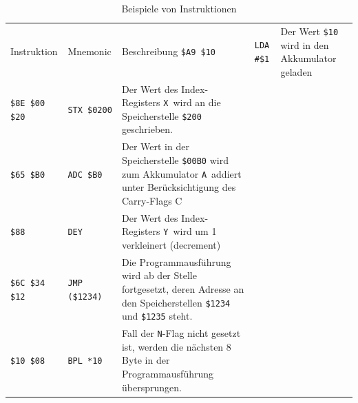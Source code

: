 \documentclass[11pt]{scrartcl}
\newcommand{\xreg}{\texttt{X}}
\newcommand{\yreg}{\texttt{Y}}
\newcommand{\acc}{\texttt{A}}
\newcommand{\nflag}{\texttt{N}}
\newcommand{\hex}[1]{\texttt{\$#1}}
\begin{document}
\begin{longtable}{@{}llp{10cm}@{}}
  \caption{Beispiele von Instruktionen}
  \label{tab:instruction_examples} \\
    \toprule
    Instruktion &  Mnemonic & Beschreibung \endhead
    \midrule
    \lstinline!$A9 $10! & \lstinline!LDA #$1!   & Der Wert \hex{10}
                                                  wird in den
                                                  Akkumulator geladen\\           
    \lstinline!$8E $00 $20! & \lstinline!STX $0200! & Der Wert des
                                                      Index-Registers
                                                      \xreg\ wird an die
                                                      Speicherstelle
                                                      \hex{200}
                                                      geschrieben. \\
    \lstinline!$65 $B0! & \lstinline!ADC $B0! & Der Wert in der
                                                Speicherstelle
                                                \hex{00B0} wird zum
                                                Akkumulator \acc\ addiert
                                                unter Berücksichtigung
                                                des Carry-Flags C \\
    \lstinline!$88! & \lstinline!DEY! & Der Wert des Index-Registers \yreg\
                                        wird um 1 verkleinert
                                        (decrement) \\
    \lstinline!$6C $34 $12! & \lstinline!JMP ($1234)! & Die
                                                       Programmausführung
                                                       wird ab der
                                                       Stelle
                                                       fortgesetzt,
                                                       deren Adresse an
                                                       den Speicherstellen
                                                       \hex{1234} und
                                                       \hex{1235}
                                                        steht. \\
    \lstinline!$10 $08! & \lstinline!BPL *10! & Fall der \nflag-Flag nicht
                                                gesetzt ist, werden die nächsten
                                                8 Byte in der
                                                Programmausführung
                                                übersprungen.


\end{longtable}
\end{document}
